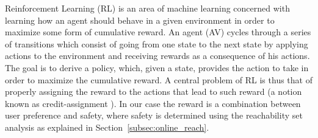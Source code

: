 
Reinforcement Learning (RL) is an area of machine learning concerned with learning how an agent should behave in a given environment in order to maximize some form of cumulative reward. 
An agent (AV) cycles through a series of transitions which consist of going from one state to the next state by applying actions to the environment and receiving rewards as a consequence of his actions. 
The goal is to derive a policy, which, given a state, provides the action to take in order to maximize the cumulative reward.
A central problem of RL is thus that of properly assigning the reward to the actions that lead to such reward (a notion known as credit-assignment \cite{kaelbling1996reinforcement, sutton1998reinforcement}). In our case the reward is a combination between user preference and safety, where safety is determined using the reachability set analysis as explained in Section~\ref{subsec:online_reach}.
